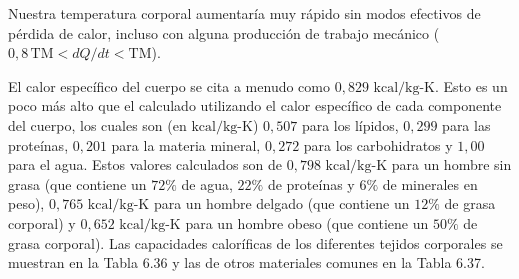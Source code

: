 \documentclass[12pt]{book}
\begin{document}
Nuestra temperatura corporal aumentaría muy rápido sin modos efectivos de pérdida de calor, incluso con alguna producción de trabajo mecánico ($0{,}8\,\text{TM} < dQ/dt < \text{TM}$).

El calor específico del cuerpo se cita a menudo como $0{,}829\text{ kcal/kg-K}$. Esto es un poco más alto que el calculado utilizando el calor específico de cada componente del cuerpo, los cuales son (en $\text{kcal/kg-K}$) $0{,}507$ para los lípidos, $0{,}299$ para las proteínas, $0{,}201$ para la materia mineral, $0{,}272$ para los carbohidratos y $1{,}00$ para el agua. Estos valores calculados son de $0{,}798\text{ kcal/kg-K}$ para un hombre sin grasa (que contiene un $72\%$ de agua, $22\%$ de proteínas y $6\%$ de minerales en peso), $0{,}765\text{ kcal/kg-K}$ para un hombre delgado (que contiene un $12\%$ de grasa corporal) y $0{,}652\text{ kcal/kg-K}$ para un hombre obeso (que contiene un $50\%$ de grasa corporal). Las capacidades caloríficas de los diferentes tejidos corporales se muestran en la Tabla 6.36 y las de otros materiales comunes en la Tabla 6.37.
\end{document}
